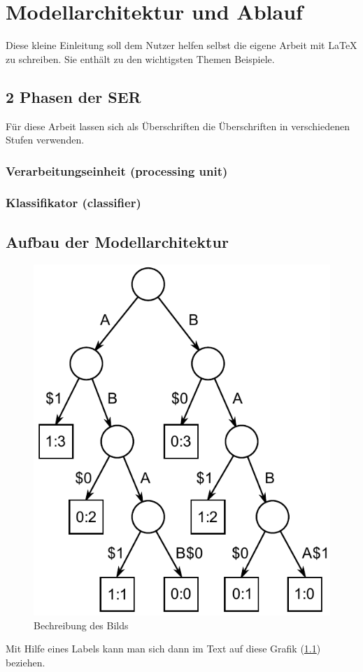 \chapter{Modellarchitektur und Ablauf}

Diese kleine Einleitung soll dem Nutzer helfen selbst die eigene Arbeit mit \LaTeX{} zu schreiben. Sie enthält zu den wichtigsten Themen Beispiele.


\section{2 Phasen der SER}

Für diese Arbeit lassen sich als Überschriften die Überschriften in verschiedenen Stufen verwenden.

\subsection{Verarbeitungseinheit (processing unit)}
\subsection{Klassifikator (classifier)}


\section{Aufbau der Modellarchitektur}


\begin{figure}[ht]
    \centering
    \includegraphics[width=.4\textwidth]{images/Suffix_tree_ABAB_BABA}
    \caption{\label{anker}Bechreibung des Bilds}
\end{figure}

Mit Hilfe eines Labels kann man sich dann im Text auf diese Grafik (\ref{anker}) beziehen. 

